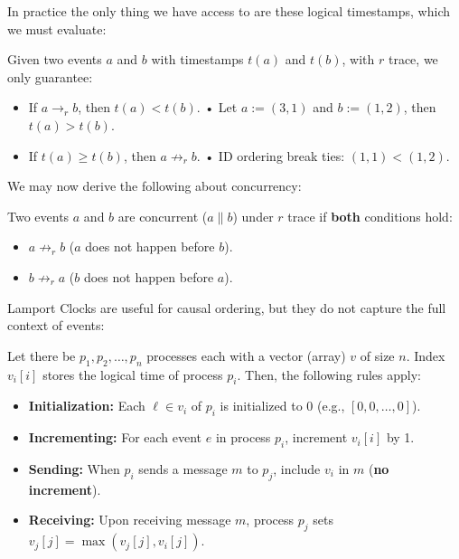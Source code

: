 \noindent
In practice the only thing we have access to are these logical timestamps, which we must evaluate:
\begin{theo}

    Given two events $a$ and $b$ with timestamps $t(a)$ and $t(b)$, with $r$ trace, we only guarantee:
    \begin{itemize}
        \item If $a \rightarrow_r b$, then $t(a) < t(b)$. \quad  • Let $a:=(3,1)$ and $b:=(1,2)$, then $t(a) > t(b)$.
        \item If $t(a) \geq t(b)$, then $a \not\rightarrow_r b$. \hspace{.6em} • ID ordering break ties: $(1,1) < (1,2)$. 
    \end{itemize}
\end{theo}

\newpage 

\noindent
We may now derive the following about concurrency:
\begin{theo}

    Two events $a$ and $b$ are concurrent ($a \parallel b$) under $r$ trace if \textbf{both} conditions 
    hold:
    \begin{itemize}
        \item $a \not\rightarrow_r b$ ($a$ does not happen before $b$).
        \item $b \not\rightarrow_r a$ ($b$ does not happen before $a$).
    \end{itemize}
\end{theo}

\noindent
Lamport Clocks are useful for causal ordering, but they do not capture the full context of events:
\begin{Def}

   Let there be $p_1, p_2, \ldots, p_n$ processes each with a vector (array) $v$ of size $n$. Index $v_i[i]$ stores the logical time of process $p_i$.
   Then, the following rules apply:
   \begin{itemize}
    \item \textbf{Initialization:} Each $\ell\in v_i$ of $p_i$ is initialized to 0 (e.g., $[0,0,\dots,0]$).
    \item \textbf{Incrementing:} For each event $e$ in process $p_i$, increment $v_i[i]$ by 1.
    \item \textbf{Sending:} When $p_i$ sends a message $m$ to $p_j$, include $v_i$ in $m$ (\textbf{no increment}).
    \item \textbf{Receiving:} Upon receiving message $m$, process $p_j$ sets $v_j[j] = \max(v_j[j], v_i[j])$.
   \end{itemize}
\end{Def}

